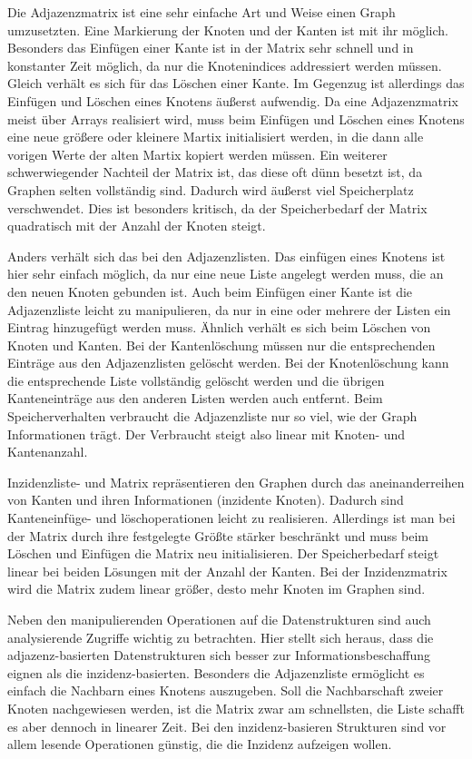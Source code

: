 \documentclass[a4paper,12pt,ngerman,chapterprefix=false,listof=totoc,bibliography=totoc]{scrreprt}
\begin{document}
{{{Die Adjazenzmatrix ist eine sehr einfache Art und Weise einen Graph umzusetzten. Eine Markierung der Knoten und der Kanten ist mit ihr möglich. Besonders das Einfügen einer Kante ist in der Matrix sehr schnell und in konstanter Zeit möglich, da nur die Knotenindices addressiert werden müssen. Gleich verhält es sich für das Löschen einer Kante. Im Gegenzug ist allerdings das Einfügen und Löschen eines Knotens äußerst aufwendig. Da eine Adjazenzmatrix meist über Arrays realisiert wird, muss beim Einfügen und Löschen eines Knotens eine neue größere oder kleinere Martix initialisiert werden, in die dann alle vorigen Werte der alten Martix kopiert werden müssen. Ein weiterer schwerwiegender Nachteil der Matrix ist, das diese oft dünn besetzt ist, da Graphen selten vollständig sind. Dadurch wird äußerst viel Speicherplatz verschwendet. Dies ist besonders kritisch, da der Speicherbedarf der Matrix quadratisch mit der Anzahl der Knoten steigt.

Anders verhält sich das bei den Adjazenzlisten. Das einfügen eines Knotens ist hier sehr einfach möglich, da nur eine neue Liste angelegt werden muss, die an den neuen Knoten gebunden ist. Auch beim Einfügen einer Kante ist die Adjazenzliste leicht zu manipulieren, da nur in eine oder mehrere der Listen ein Eintrag hinzugefügt werden muss. Ähnlich verhält es sich beim Löschen von Knoten und Kanten. Bei der Kantenlöschung müssen nur die entsprechenden Einträge aus den Adjazenzlisten gelöscht werden. Bei der Knotenlöschung kann die entsprechende Liste vollständig gelöscht werden und die übrigen Kanteneinträge aus den anderen Listen werden auch entfernt. Beim Speicherverhalten verbraucht die Adjazenzliste nur so viel, wie der Graph Informationen trägt. Der Verbraucht steigt also linear mit Knoten- und Kantenanzahl.

Inzidenzliste- und Matrix repräsentieren den Graphen durch das aneinanderreihen von Kanten und ihren Informationen (inzidente Knoten). Dadurch sind Kanteneinfüge- und löschoperationen leicht zu realisieren. Allerdings ist man bei der Matrix durch ihre festgelegte Größte stärker beschränkt und muss beim Löschen und Einfügen die Matrix neu initialisieren. Der Speicherbedarf steigt linear bei beiden Lösungen mit der Anzahl der Kanten. Bei der Inzidenzmatrix wird die Matrix zudem linear größer, desto mehr Knoten im Graphen sind.

Neben den manipulierenden Operationen auf die Datenstrukturen sind auch analysierende Zugriffe wichtig zu betrachten. Hier stellt sich heraus, dass die adjazenz-basierten Datenstrukturen sich besser zur Informationsbeschaffung eignen als die inzidenz-basierten. Besonders die Adjazenzliste ermöglicht es einfach die Nachbarn eines Knotens auszugeben. Soll die Nachbarschaft zweier Knoten nachgewiesen werden, ist die Matrix zwar am schnellsten, die Liste schafft es aber dennoch in linearer Zeit. Bei den inzidenz-basieren Strukturen sind vor allem lesende Operationen günstig, die die Inzidenz aufzeigen wollen. \cite{bettilyon_implementations_2019}

}}}
\end{document}
